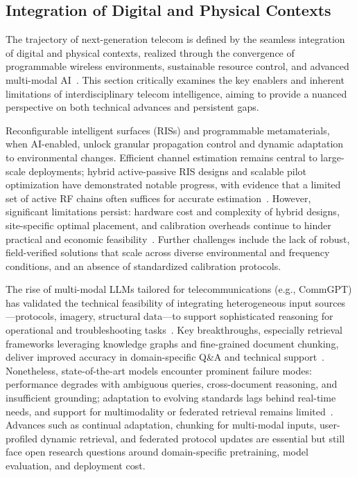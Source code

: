 \documentclass[sigconf]{acmart}
\begin{document}
\subsection{Integration of Digital and Physical Contexts}

The trajectory of next-generation telecom is defined by the seamless integration of digital and physical contexts, realized through the convergence of programmable wireless environments, sustainable resource control, and advanced multi-modal AI~\cite{ref7,ref10,ref17,ref18,ref19,ref20,ref21,ref22,ref23,ref24,ref25,ref26,ref27,ref28,ref29,ref30,ref35,ref39,ref40}. This section critically examines the key enablers and inherent limitations of interdisciplinary telecom intelligence, aiming to provide a nuanced perspective on both technical advances and persistent gaps.

Reconfigurable intelligent surfaces (RISs) and programmable metamaterials, when AI-enabled, unlock granular propagation control and dynamic adaptation to environmental changes. Efficient channel estimation remains central to large-scale deployments; hybrid active-passive RIS designs and scalable pilot optimization have demonstrated notable progress, with evidence that a limited set of active RF chains often suffices for accurate estimation~\cite{ref27,ref29,ref30,ref39,ref40}. However, significant limitations persist: hardware cost and complexity of hybrid designs, site-specific optimal placement, and calibration overheads continue to hinder practical and economic feasibility~\cite{ref27,ref29,ref30}. Further challenges include the lack of robust, field-verified solutions that scale across diverse environmental and frequency conditions, and an absence of standardized calibration protocols.

The rise of multi-modal LLMs tailored for telecommunications (e.g., CommGPT) has validated the technical feasibility of integrating heterogeneous input sources---protocols, imagery, structural data---to support sophisticated reasoning for operational and troubleshooting tasks~\cite{ref26,ref35}. Key breakthroughs, especially retrieval frameworks leveraging knowledge graphs and fine-grained document chunking, deliver improved accuracy in domain-specific Q\&A and technical support~\cite{ref26,ref35}. Nonetheless, state-of-the-art models encounter prominent failure modes: performance degrades with ambiguous queries, cross-document reasoning, and insufficient grounding; adaptation to evolving standards lags behind real-time needs, and support for multimodality or federated retrieval remains limited~\cite{ref20,ref21,ref22,ref26,ref35}. Advances such as continual adaptation, chunking for multi-modal inputs, user-profiled dynamic retrieval, and federated protocol updates are essential but still face open research questions around domain-specific pretraining, model evaluation, and deployment cost.
\end{document}
